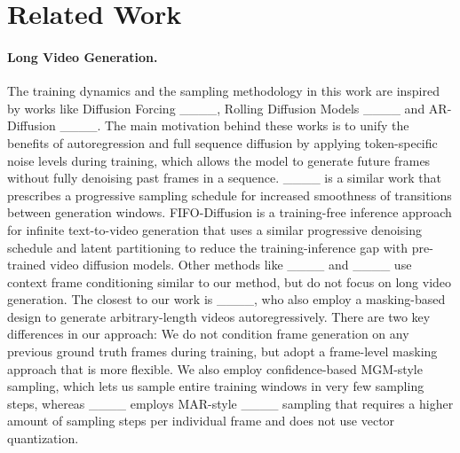 \section{Related Work}
\paragraph{Long Video Generation.} 
The training dynamics and the sampling methodology in this work are inspired by works like Diffusion Forcing ____, Rolling Diffusion Models ____ and AR-Diffusion ____. The main motivation behind these works is to unify the benefits of autoregression and full sequence diffusion by applying token-specific noise levels during training, which allows the model to generate future frames without fully denoising past frames in a sequence. ____ is a similar work that prescribes a progressive sampling schedule for increased smoothness of transitions between generation windows. FIFO-Diffusion is a training-free inference approach for infinite text-to-video generation that uses a similar progressive denoising schedule and latent partitioning to reduce the training-inference gap with pre-trained video diffusion models. Other methods like ____ and ____ use context frame conditioning similar to our method, but do not focus on long video generation. The closest to our work is ____, who also employ a masking-based design to generate arbitrary-length videos autoregressively. There are two key differences in our approach: We do not condition frame generation on any previous ground truth frames during training, but adopt a frame-level masking approach that is more flexible. We also employ confidence-based MGM-style sampling, which lets us sample entire training windows in very few sampling steps, whereas ____ employs MAR-style ____ sampling that requires a higher amount of sampling steps per individual frame and does not use vector quantization.
\vspace{-10pt}


